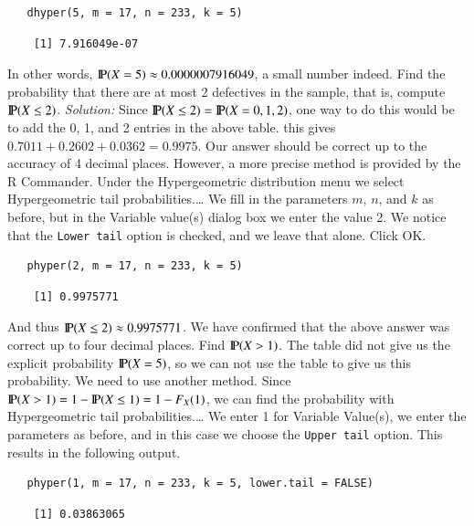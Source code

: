 \documentclass[captions=tableheading]{scrbook}
\begin{document}
\begin{example}
\begin{verbatim}
   dhyper(5, m = 17, n = 233, k = 5)
\end{verbatim}

\begin{verbatim}
    [1] 7.916049e-07
\end{verbatim}

   In other words, \(\P(X=5)\approx0.0000007916049\), a small number indeed.
Find the probability that there are at most 2 defectives in the sample, that is, compute \(\P(X\leq2)\).
   \emph{Solution:} Since \(\P(X\leq2)=\P(X=0,1,2)\), one way to do this would be to add the 0, 1, and 2 entries in the above table. this gives \(0.7011+0.2602+0.0362=0.9975\). Our answer should be correct up to the accuracy of 4 decimal places. However, a more precise method is provided by the \textsf{R} Commander. Under the \textsf{Hypergeometric distribution} menu we select \textsf{Hypergeometric tail probabilities}.\ldots{} We fill in the parameters \(m\), \(n\), and \(k\) as before, but in the \textsf{Variable value(s)} dialog box we enter the value 2. We notice that the \texttt{Lower tail} option is checked, and we leave that alone. Click \textsf{OK}.


\begin{verbatim}
   phyper(2, m = 17, n = 233, k = 5)
\end{verbatim}

\begin{verbatim}
    [1] 0.9975771
\end{verbatim}

   And thus \(\P(X\leq2)\approx 0.9975771\). We have confirmed that the above answer was correct up to four decimal places.
Find \(\P(X>1)\). 
   The table did not give us the explicit probability \(\P(X=5)\), so we can not use the table to give us this probability. We need to use another method. Since \(\P(X>1)=1-\P(X\leq1)=1-F_{X}(1)\), we can find the probability with \textsf{Hypergeometric tail probabilities}.\ldots{} We enter 1 for \textsf{Variable Value(s)}, we enter the parameters as before, and in this case we choose the \texttt{Upper tail} option. This results in the following output.


\begin{verbatim}
   phyper(1, m = 17, n = 233, k = 5, lower.tail = FALSE)
\end{verbatim}

\begin{verbatim}
    [1] 0.03863065
\end{verbatim}


\end{example}
\end{document}

